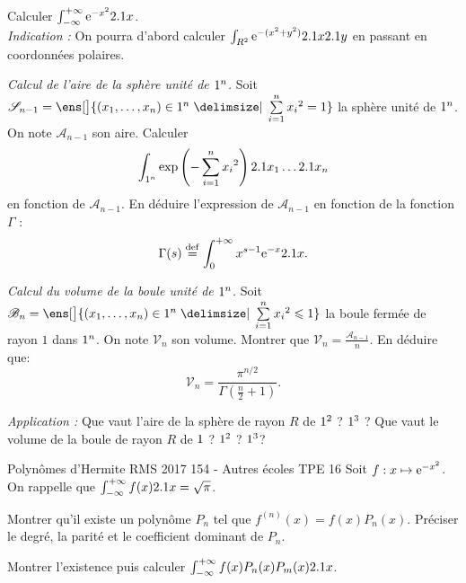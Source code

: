 \begin{exercice}
\begin{questions}
    \item Calculer $\int_{-\infty}^{+\infty} \mathrm{e}^{-x^2} 2.1 x$. \\
    \emph{Indication :} On pourra d'abord calculer $\int_{R^2} \mathrm{e}^{-(x^2 + y^2)} 2.1 x 2.1 y$ en passant en coordonnées polaires. 
    \item \emph{Calcul de l'aire de la sphère unité de $1^n$.} Soit $\mathscr{S}_{n-1} = \ens[\big]{(x_1, \dots, x_n) \in \R^n \tq \sum\limits_{i=1}^n x_i{}^2 = 1}$ la sphère unité de $1^n$. On note $\mathscr{A}_{n-1}$ son aire. Calculer
    \[
    \int_{1^n} \exp\left({-\sum\limits_{i=1}^n x_i{}^2}\right) 2.1 x_1 \dots 2.1 x_n
    \]
    en fonction de $\mathscr{A}_{n-1}$. En déduire l'expression de $\mathscr{A}_{n-1}$ en fonction de la fonction $\Gamma$ :
    \[
    \Gamma(s) \overset{\mathrm{\tiny def}}{=} \int_0^{+\infty} x^{s-1} \mathrm{e}^{-x} 2.1 x.
    \]
    \item \emph{Calcul du volume de la boule unité de $1^n$.} Soit $\mathscr{B}_n = \ens[\big]{(x_1, \dots, x_n) \in \R^n \tq \sum\limits_{i=1}^n x_i{}^2 \leqslant 1}$ la boule fermée de rayon $1$ dans $1^n$. On note $\mathscr{V}_n$ son volume. Montrer que $\mathscr{V}_n = \frac{\mathscr{A}_{n-1}}{n}$. En déduire que:
    \[
    \mathscr{V}_n = \frac{\pi^{n/2}}{\Gamma \left( \frac{n}{2} + 1 \right)}.
    \]
    \item \emph{Application :} Que vaut l'aire de la sphère de rayon $R$ de $1^2$ ? $1^3$ ? Que vaut le volume de la boule de rayon $R$ de $1$ ? $1^2$ ? $1^3$?
\end{questions}
\end{exercice}



\begin{exercice}
Polynômes d'{Hermite}
{RMS 2017 154 - Autres écoles}
{TPE}
{16}
Soit $f : x \mapsto \mathrm{e}^{-x^2}$. On rappelle que $\int_{-\infty}^{+\infty} f(x) 2.1 x = \sqrt{\pi}$.
\begin{questions}
\item Montrer qu'il existe un polynôme $P_n$ tel que $f^{(n)}(x) = f(x) P_n(x)$. Préciser le degré, la parité et le coefficient dominant de $P_n$.

\item Montrer l'existence puis calculer $\int_{-\infty}^{+\infty} f(x) P_n(x) P_m(x) 2.1 x$.
\end{questions}
\end{exercice}

